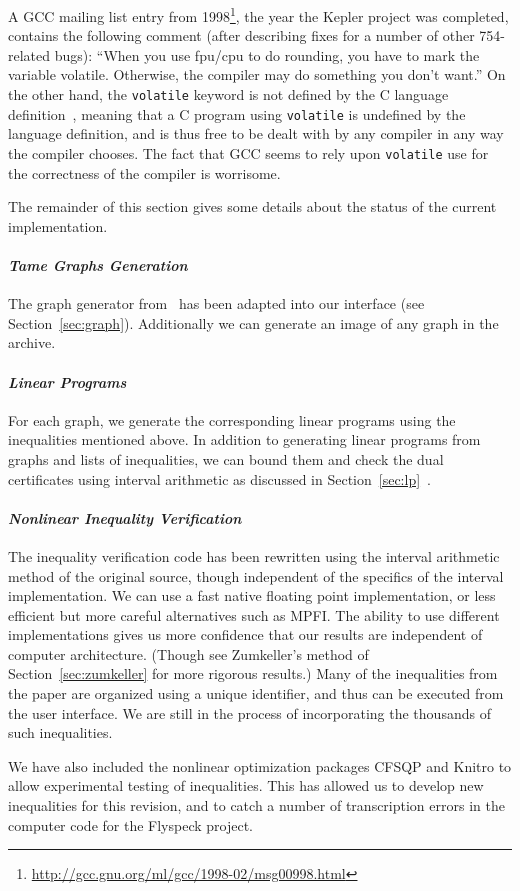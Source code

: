 A GCC mailing list entry from
1998\footnote{\url{http://gcc.gnu.org/ml/gcc/1998-02/msg00998.html}},
the year the Kepler project was completed, contains the following
comment (after describing fixes for a number of other 754-related
bugs): ``When you use fpu/cpu to do rounding, you have to mark the
variable volatile. Otherwise, the compiler may do something you don't
want.'' On the other hand, the \texttt{volatile} keyword is not
defined by the C language definition~\cite{Kernighan:1988:C}, meaning
that a C program using \texttt{volatile} is undefined by the language
definition, and is thus free to be dealt with by any compiler in any
way the compiler chooses.  The fact that GCC seems to rely upon
\texttt{volatile} use for the correctness of the compiler is
worrisome.  

The remainder of this section
gives some details about the status of the current implementation.

\paragraph{\emph{Tame Graphs Generation}} The graph generator
from~\cite{NipkowBS-IJCAR06} has been adapted into our interface (see
Section~\ref{sec:graph}).  Additionally we can generate an image of
any graph in the archive.  

\paragraph{\emph{Linear Programs}}

For each graph, we generate the corresponding linear programs using
the inequalities mentioned above.  In addition to generating linear
programs from graphs and lists of inequalities, we can bound them and
check the dual certificates using interval arithmetic as discussed in
Section~\ref{sec:lp}~\cite{Obua:2005:Thesis}.

\paragraph{\emph{Nonlinear Inequality Verification}}

The inequality verification code has been rewritten using the interval
arithmetic method of the original source, though independent of the
specifics of the interval implementation.  We can use a fast native
floating point implementation, or less efficient but more careful
alternatives such as MPFI.  The ability to use different
implementations gives us more confidence that our results are
independent of computer architecture.  (Though see Zumkeller's method
of Section~\ref{sec:zumkeller} for more rigorous results.)  Many of
the inequalities from the paper are organized using a unique
identifier, and thus can be executed from the user interface.  We are
still in the process of incorporating the thousands of such
inequalities.

We have also included the nonlinear optimization packages CFSQP
and Knitro to allow experimental testing of inequalities.  This has
allowed us to develop new inequalities for this revision, and to catch
a number of transcription errors in the computer code for the Flyspeck
project.
